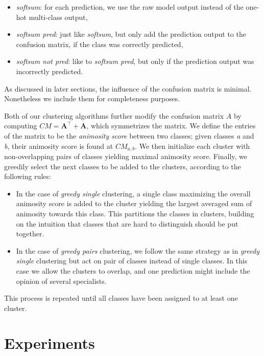 \documentclass[12pt]{article}
\begin{document}
\begin{itemize}
\itemsep1pt\parskip0pt
\item
  \emph{softsum}: for each prediction, we use the raw model output
  instead of the one-hot multi-class output,
\item
  \emph{softsum pred}: just like \emph{softsum}, but only add the
  prediction output to the confusion matrix, if the class was correctly
  predicted,
\item
  \emph{softsum not pred}: like to \emph{softsum pred}, but only if
  the prediction output was incorrectly predicted.
\end{itemize}

As discussed in later sections, the influence of the confusion matrix is
minimal. Nonetheless we include them for completeness purposes.

Both of our clustering algorithms further modify the confusion matrix
$A$ by computing $CM = \textbf{A}^\top + \textbf{A}$, which symmetrizes
the matrix. We define the entries of the matrix to be the
\emph{animosity score} between two classes; given classes \emph{a} and
\emph{b}, their animosity score is found at $CM_{a, b}$. We then
initialize each cluster with non-overlapping pairs of classes yielding
maximal animosity score. Finally, we greedily select the next classes to
be added to the clusters, according to the following rules:

\begin{itemize}
\item
  In the case of \emph{greedy single} clustering, a single class
  maximizing the overall animosity score is added to the cluster
  yielding the largest averaged sum of animosity towards this class.
  This partitions the classes in clusters, building on the intuition
  that classes that are hard to distinguish should be put together.
\item
  In the case of \emph{greedy pairs} clustering, we follow the same
  strategy as in \emph{greedy single} clustering but act on pair of
  classes instead of single classes. In this case we allow the clusters
  to overlap, and one prediction might include the opinion of several
  specialists.
\end{itemize}

This process is repeated until all classes have been assigned to at
least one cluster.

\section{Experiments}\label{experiments}
\end{document}
